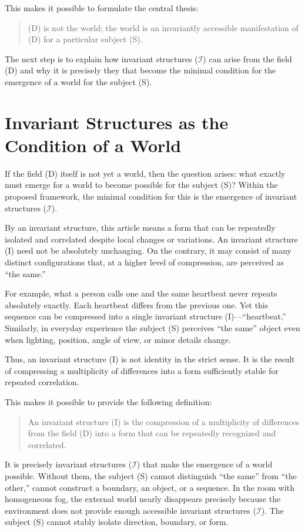 \documentclass[aps,prd,onecolumn,nofootinbib,superscriptaddress]{revtex4-2}
\begin{document}
This makes it possible to formulate the central thesis:

\begin{quote}
(D) is not the world; the world is an invariantly accessible manifestation of (D) for a particular subject (S).
\end{quote}

The next step is to explain how invariant structures ($\mathcal{I}$) can arise from the field (D) and why it is precisely they that become the minimal condition for the emergence of a world for the subject (S).

\section{Invariant Structures as the Condition of a World}
If the field (D) itself is not yet a world, then the question arises: what exactly must emerge for a world to become possible for the subject (S)? Within the proposed framework, the minimal condition for this is the emergence of invariant structures ($\mathcal{I}$).

By an invariant structure, this article means a form that can be repeatedly isolated and correlated despite local changes or variations. An invariant structure (I) need not be absolutely unchanging. On the contrary, it may consist of many distinct configurations that, at a higher level of compression, are perceived as “the same.”

For example, what a person calls one and the same heartbeat never repeats absolutely exactly. Each heartbeat differs from the previous one. Yet this sequence can be compressed into a single invariant structure (I)—“heartbeat.” Similarly, in everyday experience the subject (S) perceives “the same” object even when lighting, position, angle of view, or minor details change.

Thus, an invariant structure (I) is not identity in the strict sense. It is the result of compressing a multiplicity of differences into a form sufficiently stable for repeated correlation.

This makes it possible to provide the following definition:

\begin{quote}
An invariant structure (I) is the compression of a multiplicity of differences from the field (D) into a form that can be repeatedly recognized and correlated.
\end{quote}

It is precisely invariant structures ($\mathcal{I}$) that make the emergence of a world possible. Without them, the subject (S) cannot distinguish “the same” from “the other,” cannot construct a boundary, an object, or a sequence. In the room with homogeneous fog, the external world nearly disappears precisely because the environment does not provide enough accessible invariant structures ($\mathcal{I}$). The subject (S) cannot stably isolate direction, boundary, or form.
\end{document}
